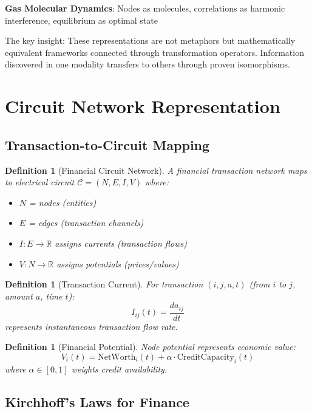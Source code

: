 \documentclass[12pt]{article}
\newtheorem{definition}[theorem]{Definition}
\begin{document}
\textbf{Gas Molecular Dynamics}: Nodes as molecules, correlations as harmonic interference, equilibrium as optimal state \cite{boltzmann1877beziehung}

The key insight: These representations are not metaphors but mathematically equivalent frameworks connected through transformation operators. Information discovered in one modality transfers to others through proven isomorphisms.

\section{Circuit Network Representation}

\subsection{Transaction-to-Circuit Mapping}

\begin{definition}[Financial Circuit Network]
A financial transaction network maps to electrical circuit $\mathcal{C} = (N, E, I, V)$ where:
\begin{itemize}
    \item $N$ = nodes (entities)
    \item $E$ = edges (transaction channels)
    \item $I: E \to \mathbb{R}$ assigns currents (transaction flows)
    \item $V: N \to \mathbb{R}$ assigns potentials (prices/values)
\end{itemize}
\end{definition}

\begin{definition}[Transaction Current]
For transaction $(i,j,a,t)$ (from $i$ to $j$, amount $a$, time $t$):
$$
I_{ij}(t) = \frac{da_{ij}}{dt}
$$
represents instantaneous transaction flow rate.
\end{definition}

\begin{definition}[Financial Potential]
Node potential represents economic value:
$$
V_i(t) = \text{NetWorth}_i(t) + \alpha \cdot \text{CreditCapacity}_i(t)
$$
where $\alpha \in [0,1]$ weights credit availability.
\end{definition}

\subsection{Kirchhoff's Laws for Finance}
\end{document}
